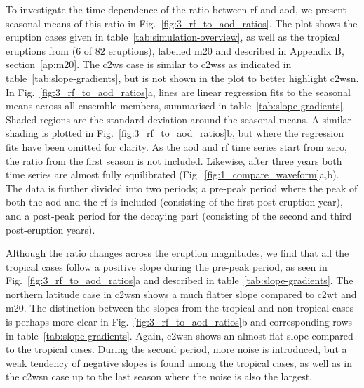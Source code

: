 \documentclass{ametsocV6.1}
\begin{document}
To investigate the time dependence of the ratio between \gls{rf} and \gls{aod}, we
present seasonal means of this ratio in Fig.~\ref{fig:3_rf_to_aod_ratios}. The plot
shows the eruption cases given in table~\ref{tab:simulation-overview}, as well as the
tropical eruptions from \citet{marshall2020dataset} (\(6\) of \(82\) eruptions),
labelled \gls{m20} and described in Appendix B, section~\ref{ap:m20}. The \gls{c2ws}
case is similar to \gls{c2wss} as indicated in table~\ref{tab:slope-gradients}, but is
not shown in the plot to better highlight \gls{c2wsn}. In
Fig.~\ref{fig:3_rf_to_aod_ratios}a, lines are linear regression fits to the seasonal
means across all ensemble members, summarised in table~\ref{tab:slope-gradients}. Shaded
regions are the standard deviation around the seasonal means. A similar shading is
plotted in Fig.~\ref{fig:3_rf_to_aod_ratios}b, but where the regression fits have been
omitted for clarity. As the \gls{aod} and \gls{rf} time series start from zero, the
ratio from the first season is not included. Likewise, after three years both time
series are almost fully equilibrated (Fig.~\ref{fig:1_compare_waveform}a,b). The data is
further divided into two periods; a pre-peak period where the peak of both the \gls{aod}
and the \gls{rf} is included (consisting of the first post-eruption year), and a
post-peak period for the decaying part (consisting of the second and third post-eruption
years).

Although the ratio changes across the eruption magnitudes, we find that all the tropical
cases follow a positive slope during the pre-peak period, as seen in
Fig.~\ref{fig:3_rf_to_aod_ratios}a and described in table~\ref{tab:slope-gradients}. The
northern latitude case in \gls{c2wsn} shows a much flatter slope compared to \gls{c2wt}
and \gls{m20}. The distinction between the slopes from the tropical and non-tropical
cases is perhaps more clear in Fig.~\ref{fig:3_rf_to_aod_ratios}b and corresponding rows
in table~\ref{tab:slope-gradients}. Again, \gls{c2wsn} shows an almost flat slope
compared to the tropical cases. During the second period, more noise is introduced, but
a weak tendency of negative slopes is found among the tropical cases, as well as in the
\gls{c2wsn} case up to the last season where the noise is also the largest.
\end{document}

